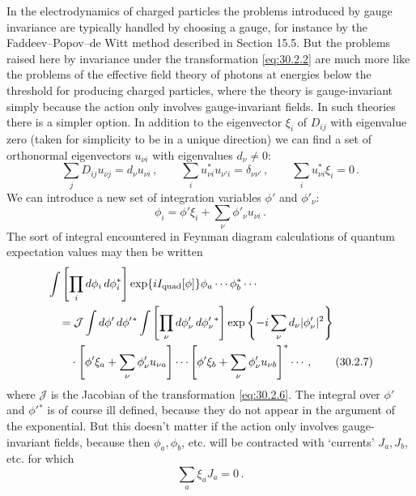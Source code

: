 In the electrodynamics of charged particles the problems introduced by gauge
invariance are typically handled by choosing a gauge, for instance by the
Faddeev--Popov--de Witt method described in Section 15.5. But the problems
raised here by invariance under the transformation \eqref{eq:30.2.2} are much
more like the problems of the effective field theory of photons at energies
below the threshold for producing charged particles, where the theory is
gauge-invariant simply because the action only involves gauge-invariant
fields. In such theories there is a simpler option. In addition to the
eigenvector \(\xi_i\) of \(D_{ij}\) with eigenvalue zero (taken for simplicity
to be in a unique direction) we can find a set of orthonormal eigenvectors
\(u_{\nu i}\) with eigenvalues \(d_\nu\neq0\):
\begin{equation}
  \sum_jD_{ij}u_{\nu j}=d_\nu u_{\nu i}\,,
  \qquad
  \sum_i u_{\nu i}^*u_{\nu'i}=\delta_{\nu\nu'}\,,
  \qquad
  \sum_i u_{\nu i}^*\xi_i=0\,.
  \tag{30.2.5}\label{eq:30.2.5}
\end{equation}
We can introduce a new set of integration variables \(\phi'\) and
\(\phi'_\nu\):
\begin{equation}
  \phi_i=\phi'\xi_i+\sum_\nu\phi'_\nu u_{\nu i}\,.
  \tag{30.2.6}\label{eq:30.2.6}
\end{equation}
The sort of integral encountered in Feynman diagram calculations of quantum
expectation values may then be written
\begin{align}
  &\int\left[\prod_i d\phi_i\,d\phi_i^*\right]
    \exp\{iI_{\mathrm{quad}}[\phi]\}
    \phi_a\cdots\phi_b^*\cdots
  \notag\\
  &\quad={}
    \mathcal{J}\int d\phi'\,d\phi'{}^*
    \int\left[\prod_\nu d\phi'_\nu\,d\phi_\nu'{}^*\right]
    \exp\left\{-i\sum_\nu d_\nu|\phi'_\nu|^2\right\}
  \notag\\
  &\qquad\cdot
    \left[\phi'\xi_a+\sum_\nu\phi'_\nu u_{\nu a}\right]\cdots
    \left[\phi'\xi_b+\sum_\nu\phi'_\nu u_{\nu b}\right]^*\cdots\,,
  \tag{30.2.7}\label{eq:30.2.7}
\end{align}
where \(\mathcal{J}\) is the Jacobian of the transformation
\eqref{eq:30.2.6}. The integral over \(\phi'\) and \(\phi'{}^*\) is of course
ill defined, because they do not appear in the argument of the exponential.
But this doesn't matter if the action only involves gauge-invariant fields,
because then \(\phi_a,\phi_b\), etc. will be contracted with `currents'
\(J_a,J_b\), etc. for which
\begin{equation}
  \sum_a\xi_aJ_a=0\,.
  \tag{30.2.8}\label{eq:30.2.8}
\end{equation}
